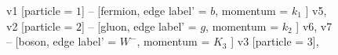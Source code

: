 \documentclass{revtex4}
\begin{document}
\begin{figure}[!htb]
\begin{center}
{    %
v1 [particle = \(1\)] -- [fermion, edge label' = \(b\), momentum = \(k_{1}\) ] v5, 
v2 [particle = \(2\)] -- [gluon, edge label' = \(g\), momentum = \(k_{2}\) ] v6, 
v7 -- [boson, edge label' = \(W^{-}\), momentum = \(K_{3}\) ] v3 [particle = \(3\)], 
}
\end{center}
\end{figure}
\end{document}
